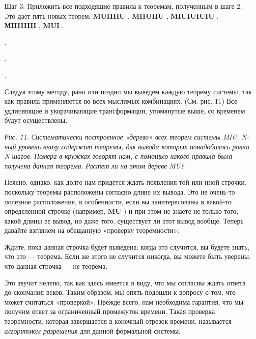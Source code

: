 Шаг 3: Приложить все подходящие правила к теоремам, полученным в шаге 2. Это дает пять новых теорем: \textbf{MUIIIIU} , \textbf{MIIUIIU} , \textbf{MIUIUIUIU} , \textbf{МIIIIIIII} , \textbf{MUI} .

.

.

.

Следуя этому методу, рано или поздно мы выведем каждую теорему системы, так как правила применяются во всех мыслимых комбинациях. (См. рис. 11) Все удлиняющие и укорачивающие трансформации, упомянутые выше, со временем будут осуществлены.

\emph{Рис. 11. Систематически построенное «дерево» всех теорем системы MIU. N-ный уровень внизу содержит теоремы, для вывода которых понадобилось ровно N шагов. Номера в кружках говорят нам, с помощью какого правила была получена данная теорема. Растет ли на этом дереве MU?}

Неясно, однако, как долго нам придется ждать появления той или иной строчки, поскольку теоремы расположены согласно длине их вывода. Это не очень-то полезное расположение, в особенности, если вы заинтересованы в какой-то определенной строчке (например, \textbf{MU} ) и при этом не знаете не только того, какой длины ее вывод, но даже того, существует ли этот вывод вообще. Теперь давайте взглянем на обещанную «проверку теоремности»:

Ждите, пока данная строчка будет выведена; когда это случится, вы будете знать, что это --- теорема. Если же этого не случится никогда, вы можете быть уверены, что данная строчка --- не теорема.

Это звучит нелепо, так как здесь имеется в виду, что мы согласны ждать ответа до скончания веков. Таким образом, мы опять подошли к вопросу о том, что может считаться «проверкой». Прежде всего, нам необходима гарантия, что мы получим ответ за ограниченный промежуток времени. Такая проверка теоремности, которая завершается в конечный отрезок времени, называется \emph{алгоритмом разрешения} для данной формальной системы.

